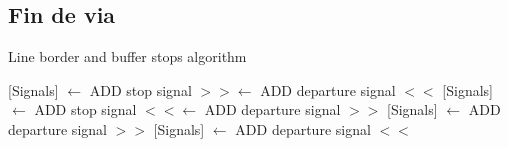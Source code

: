 \subsection{Fin de via}

\lipsum[1]

\begin{algorithm}[hbt!]
            \caption{Line border and buffer stops algorithm}\label{alg:LBBS}
            \DontPrintSemicolon
            \SetNoFillComment
            \LinesNotNumbered 
            {
                {
                    [Signals] $\gets$ ADD stop signal $>>$\;
                    [Signals] $\gets$ ADD departure signal $<<$\;
                }
                {
                    [Signals] $\gets$ ADD stop signal $<<$\;
                    [Signals] $\gets$ ADD departure signal $>>$\;
                }
            }
            {
                {
                    {
                        [Signals] $\gets$ ADD departure signal $>>$\;
                    }
                    {
                        [Signals] $\gets$ ADD departure signal $<<$\;
                    }
                }
            }
            \KwResult{[Signals]} 
        \end{algorithm}
